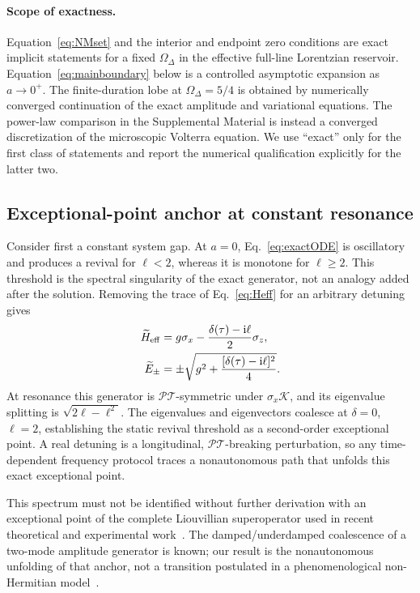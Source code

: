 \documentclass[reprint,superscriptaddress,floatfix,amsmath,amssymb,prresearch,aps]{revtex4-2}
\newcommand{\ii}{\mathrm{i}}
\begin{document}
\paragraph{Scope of exactness.}
Equation~\eqref{eq:NMset} and the interior and endpoint zero conditions are
exact implicit statements for a fixed \(\Omega_\Delta\) in the effective
full-line Lorentzian reservoir. Equation~\eqref{eq:mainboundary} below is a
controlled asymptotic
expansion as \(a\to0^+\). The finite-duration lobe at
\(\Omega_\Delta=5/4\) is obtained by numerically converged continuation of
the exact amplitude and variational equations. The power-law comparison in
the Supplemental Material is instead a converged discretization of the
microscopic Volterra equation. We use ``exact'' only for the first class of
statements and report the numerical qualification explicitly for the latter
two.

\subsection{Exceptional-point anchor at constant resonance}
\label{subsec:EP}
Consider first a constant system gap. At \(a=0\),
Eq.~\eqref{eq:exactODE} is oscillatory and produces a revival for
\(\ell<2\), whereas it is monotone for \(\ell\geq2\). This threshold is the
spectral singularity of the exact generator, not an analogy added after the
solution. Removing the trace of Eq.~\eqref{eq:Heff} for an arbitrary detuning
gives
\begin{equation}
\begin{aligned}
\widetilde H_{\rm eff}
&=g\sigma_x-\frac{\delta(\tau)-\ii\ell}{2}\sigma_z,\\
\widetilde E_\pm
&=\pm\sqrt{g^2+\frac{[\delta(\tau)-\ii\ell]^2}{4}}.
\end{aligned}
\label{eq:EPdiscriminant}
\end{equation}
At resonance this generator is \(\mathcal{PT}\)-symmetric under
\(\sigma_x\mathcal K\), and its eigenvalue splitting is
\(\sqrt{2\ell-\ell^2}\). The eigenvalues and eigenvectors coalesce at
\(\delta=0\), \(\ell=2\), establishing the static revival threshold as a
second-order exceptional point. A real detuning is a longitudinal,
\(\mathcal{PT}\)-breaking perturbation, so any time-dependent frequency
protocol traces a nonautonomous path that unfolds this exact exceptional
point.

This spectrum must not be identified without further derivation with an
exceptional point of the complete Liouvillian superoperator used in recent
theoretical and experimental work~\cite{Lin2025,ZhangEP2025}. The
damped/underdamped coalescence of a two-mode amplitude generator is known; our
result is the nonautonomous unfolding of that anchor, not a transition
postulated in a phenomenological non-Hermitian model~\cite{Heiss2012,Minganti2022}.
\end{document}
